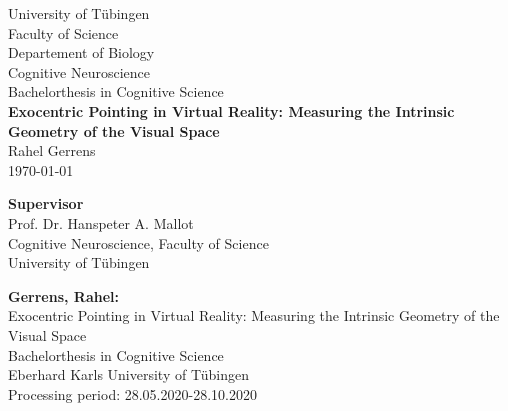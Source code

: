 \documentclass[twoside,12pt,a4paper]{report}
\begin{document}
 
\begin{titlepage}
 \begin{center}
  {\LARGE University of T\"ubingen}\\
  {\large Faculty of Science \\
Departement of Biology\\
Cognitive Neuroscience \\[4cm]}
  {\huge Bachelorthesis in Cognitive Science\\[2cm]}
  {\Large\bf  Exocentric Pointing in Virtual Reality: \large{Measuring the Intrinsic Geometry of the Visual Space} \\[1.5cm]}
 {\large Rahel Gerrens}\\[0.5cm]
\today\\[3cm]
\begin{center}{\small\bf Supervisor}\\[0.5cm]
{\large Prof. Dr. Hanspeter A. Mallot}\\
  {\footnotesize Cognitive Neuroscience, Faculty of Science\\
	University of T\"ubingen}	\end{center}
	
	
  \end{center}
\end{titlepage}


\thispagestyle{empty}
\vspace*{\fill}
\begin{minipage}{13.2cm}
\textbf{Gerrens, Rahel:}\\
Exocentric Pointing in Virtual Reality: Measuring the Intrinsic Geometry of the Visual Space\\ 
Bachelorthesis in Cognitive Science\\
Eberhard Karls University of T\"ubingen\\
Processing period: 28.05.2020-28.10.2020
\end{minipage}
\newpage

\end{document}
